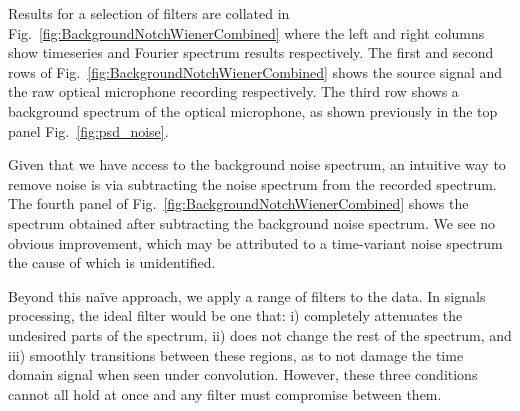 \documentclass[paper-main.tex]{subfiles}
\begin{document}

Results for a selection of filters are collated in Fig.~\ref{fig:BackgroundNotchWienerCombined} where the left and right columns show timeseries and Fourier spectrum results respectively. 
The first and second rows of Fig.~\ref{fig:BackgroundNotchWienerCombined} shows the source signal and the raw optical microphone recording respectively. 
The third row shows a background spectrum of the optical microphone, as shown previously in the top panel Fig.~\ref{fig:psd_noise}.


Given that we have access to the background noise spectrum, an intuitive way to remove noise is via subtracting the noise spectrum from the recorded spectrum. 
The fourth panel of Fig.~\ref{fig:BackgroundNotchWienerCombined} shows the spectrum obtained after subtracting the background noise spectrum. 
We see no obvious improvement, which may be attributed to a time-variant noise spectrum the cause of which is unidentified. %


Beyond this na\"{i}ve approach, we apply a range of filters to the data.
In signals processing, the ideal filter would be one that:
i) completely attenuates the undesired parts of the spectrum, 
ii) does not change the rest of the spectrum, and 
iii) smoothly transitions between these regions, as to not damage the time domain signal when seen under convolution. 
However, these three conditions cannot all hold at once and any filter must compromise between them. 
\end{document}
